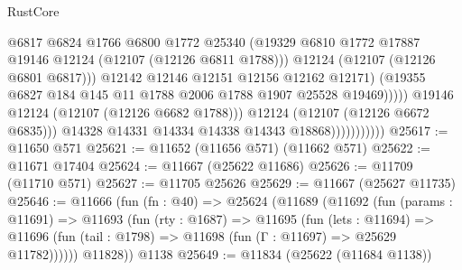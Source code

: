 \begin{lexlean}{RustCore}
\begin{coremodule}
                                          @6817
                                          @6824
                                          @1766
                                          @6800
                                          @1772
                                          @25340
                                          (@19329
                                            @6810
                                            @1772
                                            @17887
                                            @19146
                                            @12124
                                            (@12107 (@12126 @6811 @1788)))
                                          @12124
                                          (@12107 (@12126 @6801 @6817)))
                                        @12142
                                        @12146
                                        @12151
                                        @12156
                                        @12162
                                        @12171)
                                      (@19355
                                        @6827
                                        @184
                                        @145
                                        @11
                                        @1788
                                        @2006
                                        @1788
                                        @1907
                                        @25528
                                        @19469)))))
                              @19146
                              @12124
                              (@12107 (@12126 @6682 @1788)))
                            @12124
                            (@12107 (@12126 @6672 @6835)))
                          @14328
                          @14331
                          @14334
                          @14338
                          @14343
                          @18868)))))))))))
@25617 := @11650 @571
@25621 := @11652 (@11656 @571) (@11662 @571)
@25622 := @11671 @17404
@25624 := @11667 (@25622 @11686)
@25626 := @11709 (@11710 @571)
@25627 := @11705 @25626
@25629 := @11667 (@25627 @11735)
@25646 := @11666
    (fun (fn : @40) =>
    @25624
      (@11689
        (@11692
          (fun (params : @11691) =>
          @11693
            (fun (rty : @1687) =>
            @11695
              (fun (lets : @11694) =>
              @11696 (fun (tail : @1798) => @11698 (fun (Γ : @11697) => @25629 @11782))))))
        @11828))
    @1138
@25649 := @11834 (@25622 (@11684 @1138))

\end{coremodule}
\end{lexlean}
